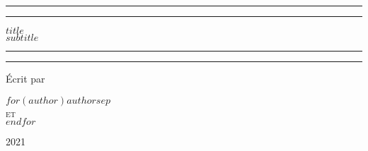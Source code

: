 \documentclass{book}
\begin{document}
\begin{titlepage} %
	\centering %
	\scshape %
	\vspace*{\baselineskip} %
	\rule{\textwidth}{1.6pt}\vspace*{-\baselineskip}\vspace*{2pt} %
	\rule{\textwidth}{0.4pt} %
	\vspace{0.75\baselineskip} %

	{\Huge $title$}\\[20pt]
	{\Large $subtitle$ \\[20pt]}


	\vspace{1\baselineskip} %
	\rule{\textwidth}{0.4pt}\vspace*{-\baselineskip}\vspace{3.2pt} %
	\rule{\textwidth}{1.6pt} %
	\vspace{2\baselineskip} %


	\vspace*{3\baselineskip} %

	Écrit par

	\vspace{0.5\baselineskip} %
	{\scshape\Large $for(author)$$author$$sep$ \vspace{0.3\baselineskip} \\[10pt] et \\[10pt]
   \vspace{0.3\baselineskip} $endfor$} %

	\vspace{0.5\baselineskip} %

	\vfill %

	\vspace{0.3\baselineskip} %
	2021 %


\end{titlepage}
\end{document}
